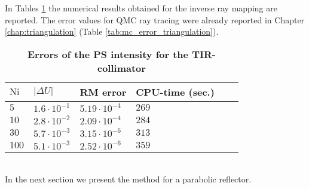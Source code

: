 In Tables \ref{tab:ray_mapping_tir} the numerical results obtained for the inverse ray mapping are reported. The error values for QMC ray tracing were already reported in Chapter \ref{chap:triangulation} (Table \ref{tab:mc_error_triangulation}).
\begin{table}[t] 
\centering
\caption{\bf Errors of the PS intensity for the TIR-collimator}
\begin{tabular}{llllll}
 \hline  $\textrm{Ni}$\; & $|\Delta U|$  & RM error & CPU-time (sec.)\\
  \hline 
 $5$    & $1.6\cdot 10^{-1}$   & $5.19\cdot10^{-4}$     & $269$  \\
$10$    & $2.8\cdot 10^{-2}$ & $2.09\cdot 10^{-4}$   & $284$   \\
$30$   & $5.7 \cdot 10^{-3}$ & $3.15\cdot 10^{-6}$   & $313$  \\
$100$  & $5.1 \cdot 10^{-3}$ & $2.52\cdot 10^{-6}$   & $359$  \\
 \hline
 \end{tabular}
 \label{tab:ray_mapping_tir}
 \end{table}
\\ \indent In the next section we present the method for a parabolic reflector.
